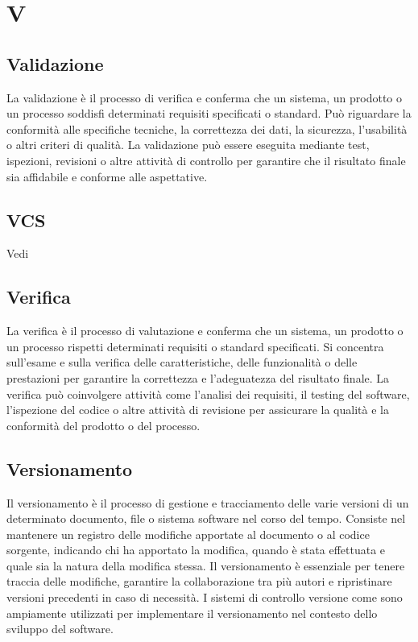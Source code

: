 \section{V}

\vspace{2em}
\subsection*{Validazione}
\par La validazione è il processo di verifica e conferma che un sistema, un prodotto o un processo soddisfi determinati requisiti specificati o standard. Può riguardare la conformità alle specifiche tecniche, la correttezza dei dati, la sicurezza, l'usabilità o altri criteri di qualità. La validazione può essere eseguita mediante test, ispezioni, revisioni o altre attività di controllo per garantire che il risultato finale sia affidabile e conforme alle aspettative.

\vspace{2em}
\subsection*{VCS}
\par Vedi 


\vspace{2em}
\subsection*{Verifica}
\par La verifica è il processo di valutazione e conferma che un sistema, un prodotto o un processo rispetti determinati requisiti o standard specificati. Si concentra sull'esame e sulla verifica delle caratteristiche, delle funzionalità o delle prestazioni per garantire la correttezza e l'adeguatezza del risultato finale. La verifica può coinvolgere attività come l'analisi dei requisiti, il testing del software, l'ispezione del codice o altre attività di revisione per assicurare la qualità e la conformità del prodotto o del processo.

\vspace{2em}
\subsection*{Versionamento}
\par Il versionamento è il processo di gestione e tracciamento delle varie versioni di un determinato documento, file o sistema software nel corso del tempo. Consiste nel mantenere un registro delle modifiche apportate al documento o al codice sorgente, indicando chi ha apportato la modifica, quando è stata effettuata e quale sia la natura della modifica stessa. Il versionamento è essenziale per tenere traccia delle modifiche, garantire la collaborazione tra più autori e ripristinare versioni precedenti in caso di necessità. I sistemi di controllo versione come  sono ampiamente utilizzati per implementare il versionamento nel contesto dello sviluppo del software.

